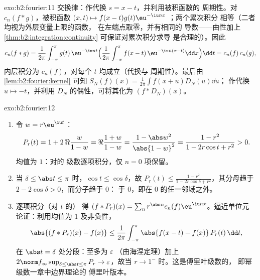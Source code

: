 \begin{solution}{exo:b2:fourier:11}
交换律：作代换 $s = x - t$，并利用被积函数的
周期性。对 $c_n(f * g)$，被积函数 $(x, t) \mapsto
f(x-t)g(t)\eu^{-\iu nx}$ ；两个累次积分
相等（二者均视为外层变量上限的函数，
在左端点取零，并有相同的
导数——由性加上
\cref{thm:b2:integration:continuity} 可保证对累次积分求导
是合理的）。因此
\[
c_n(f*g) = \frac{1}{2\pi}\int_{-\pi}^{\pi} g(t)\,\eu^{-\iu nt}
\Bigl(\frac{1}{2\pi}\int_{-\pi}^{\pi}
f(x-t)\,\eu^{-\iu n(x-t)}\dd x\Bigr)\dd t
= c_n(f)\,c_n(g),
\]
内层积分为 $c_n(f)$，对每个 $t$ 均成立（代换与
周期性）。最后由 \cref{lem:b2:fourier:kernel} 可知
$S_N(f)(x) = \frac{1}{2\pi}\int f(x+u)D_N(u)\dd u$；
作代换 $u \mapsto -t$，并利用 $D_N$ 的偶性，可将其化为
$(f * D_N)(x)$。
\end{solution}

\begin{solution}{exo:b2:fourier:12}
\begin{enumerate}
  \item 令 $w = r\eu^{\iu t}$：
        \[
        P_r(t) = 1 + 2\,\Re\frac{w}{1 - w}
        = \Re\frac{1 + w}{1 - w}
        = \frac{1 - \abs w^2}{\abs{1 - w}^2}
        = \frac{1 - r^2}{1 - 2r\cos t + r^2} > 0 .
        \]
        均值为 $1$：对的
        级数逐项积分，仅 $n = 0$ 项保留。
  \item 当 $\delta \leq \abs t \leq \pi$ 时，$\cos t \leq
        \cos\delta$，故 $P_r(t) \leq \frac{1 - r^2}{1 -
        2r\cos\delta + r^2}$，其分母趋于 $2 -
        2\cos\delta > 0$，而分子趋于 $0$：
        于 $0$，即在
        $0$ 的任一邻域之外。
  \item 逐项积分（对 $t$ 的）
        得 $(f * P_r)(x) = \sum_n r^{\abs
        n}c_n(f)\eu^{\iu nx}$。逼近单位元
        论证：利用均值为 $1$ 及非负性，
        \[
        \abs{(f*P_r)(x) - f(x)}
        \leq \frac{1}{2\pi}\int_{-\pi}^{\pi}
        \abs{f(x-t) - f(x)}\,P_r(t)\,\dd t ,
        \]
        在 $\abs t = \delta$ 处分段：至多为 $\varepsilon$
        （由海涅定理）加上 $2\norm f_\infty\sup_{\delta\leq\abs
        t\leq\pi}P_r \to \varepsilon$，故当
        $r \to 1^-$ 时。这是傅里叶级数的，
        即幂级数一章中边界理论的
        傅里叶版本。
\end{enumerate}
\end{solution}

